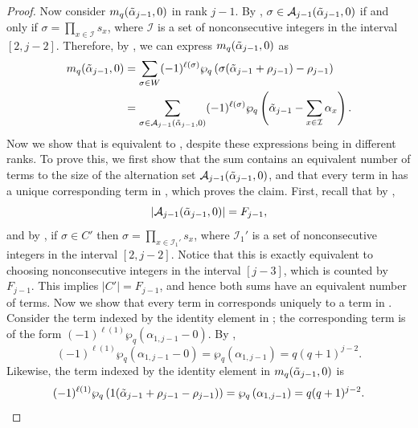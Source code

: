 \documentclass[10pt]{article}
\newcommand{\hr}[0]{\Tilde{\alpha}}
\newcommand{\qpartition}[1]{\wp_q\left(#1\right)}
\begin{document}
\begin{proof}
    Now consider $m_q(\hr_{j-1},0)$ in rank $j-1$. By , $\sigma\in\mathcal{A}_{j-1}(\hr_{j-1},0)$ if and only if $\sigma=\prod_{x\in\mathcal{I}}s_x$, where $\mathcal{I}$ is a set of nonconsecutive integers in the interval $[2,j-2]$. Therefore, by , we can express $m_q(\hr_{j-1},0)$ as
    \begin{align}
        m_q(\hr_{j-1},0) &= \sum_{\sigma\in W}(-1)^{\ell(\sigma)}\qpartition{\sigma(\hr_{j-1}+\rho_{j-1})-\rho_{j-1}}\notag \\
        &= \sum_{\sigma\in\mathcal{A}_{j-1}(\hr_{j-1},0)}(-1)^{\ell(\sigma)}\qpartition{\hr_{j-1}-\sum_{x\in\mathcal{I}}\alpha_x}.\label{zero weight mult for C'}
    \end{align}
    Now we show that  is equivalent to , despite these expressions being in different ranks. To prove this, we first show that the sum contains an equivalent number of terms to the size of the alternation set $\mathcal{A}_{j-1}(\hr_{j-1},0)$, and that every term in  has a unique corresponding term in , which proves the claim. First, recall that by ,
    \begin{equation*}
        |\mathcal{A}_{j-1}(\hr_{j-1},0)|=F_{j-1},
    \end{equation*}
    and by , if $\sigma\in C'$ then $\sigma=\prod_{x\in\mathcal{I}_1'}s_x$, where $\mathcal{I}_1'$ is a set of nonconsecutive integers in the interval $[2,j-2]$. Notice that this is exactly equivalent to choosing nonconsecutive integers in the interval $[j-3]$, which is counted by $F_{j-1}$. This implies $|C'|=F_{j-1}$, and hence both sums have an equivalent number of terms. Now we show that every term in  corresponds uniquely to a term in . Consider the term indexed by the identity element in ; the corresponding term is of the form $(-1)^{\ell(1)}\qpartition{\alpha_{1,j-1}-0}$. By ,
    \begin{equation*}
        (-1)^{\ell(1)}\qpartition{\alpha_{1,j-1}-0} = \qpartition{\alpha_{1,j-1}} = q(q+1)^{j-2}.
    \end{equation*}
    Likewise, the term indexed by the identity element in $m_q(\hr_{j-1},0)$ is 
    \begin{equation*}
        (-1)^{\ell(1)}\qpartition{1(\hr_{j-1}+\rho_{j-1}-\rho_{j-1})}=\qpartition{\alpha_{1,j-1}} = q(q+1)^{j-2}.

\end{equation*}
\end{proof}
\end{document}
